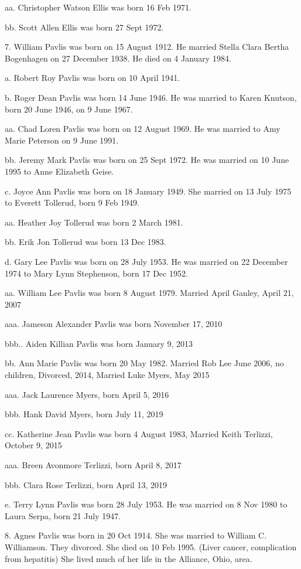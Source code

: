 \documentclass[a4paper]{article}
\begin{document}
aa. Christopher Watson Ellis was born 16 Feb 1971.

bb. Scott Allen Ellis was born 27 Sept 1972.

7. William Pavlis was born on 15 August 1912.  He married Stella Clara Bertha Bogenhagen on 27 December 1938.  He died on 4 January 1984.

a. Robert Roy Pavlis was born on 10 April 1941. 

b. Roger Dean Pavlis was born 14 June 1946.  He was married to Karen Knutson, born 20 June 1946, on 9 June 1967.

aa.  Chad Loren Pavlis was born on 12 August 1969.  He was married to Amy Marie Peterson on 9 June 1991.

bb. Jeremy Mark Pavlis was born on 25 Sept 1972.  He was married on 10 June 1995 to Anne Elizabeth Geise.

c. Joyce Ann Pavlis was born on 18 January 1949.  She married on 13 July 1975 to Everett Tollerud, born 9 Feb 1949.  

aa. Heather Joy Tollerud was born 2 March 1981.

bb. Erik Jon Tollerud was born 13 Dec 1983.

d. Gary Lee Pavlis was born on 28 July 1953.  He was married on 22 December 1974 to Mary Lynn Stephenson, born 17 Dec 1952.

aa. William Lee Pavlis was born 8 August 1979.  Married April Ganley, April 21, 2007

aaa. Jameson Alexander Pavlis was born November 17, 2010

bbb..  Aiden Killian Pavlis was born January 9, 2013

bb. Ann Marie Pavlis was born 20 May 1982.  Married Rob Lee June 2006, no children, Divorced, 2014, Married Luke Myers, May 2015

aaa.  Jack Laurence Myers, born April 5, 2016

bbb.  Hank David Myers, born July 11, 2019

cc. Katherine Jean Pavlis was born 4 August 1983, Married Keith Terlizzi, October 9, 2015

aaa. Breen Avonmore Terlizzi, born April 8, 2017

bbb. Clara Rose Terlizzi, born April 13, 2019

e. Terry Lynn Pavlis was born 28 July 1953.  He was married on 8 Nov 1980 to Laura Serpa, born 21 July 1947.  

8. Agnes Pavlis was born in 20 Oct 1914.  She was married to William C. Williamson.  They divorced.  She died on 10 Feb 1995.  (Liver cancer, complication from hepatitis)  She lived much of her life in the Alliance, Ohio, area.
\end{document}
